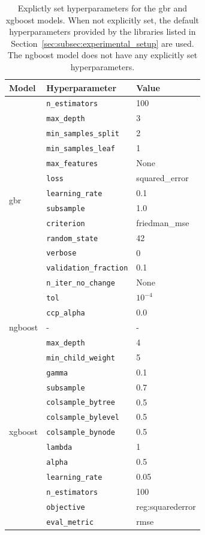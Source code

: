 \begin{table}[h]
\centering
\begin{tabular}{@{}llp{}@{}}
\toprule
\textbf{Model} & \textbf{Hyperparameter} & \textbf{Value} \\
\midrule
\multirow{14}{*}{\gls{gbr}}
& \texttt{n\_estimators} & 100 \\
& \texttt{max\_depth} & 3 \\
& \texttt{min\_samples\_split} & 2 \\
& \texttt{min\_samples\_leaf} & 1 \\
& \texttt{max\_features} & None \\
& \texttt{loss} & squared\_error \\
& \texttt{learning\_rate} & 0.1 \\
& \texttt{subsample} & 1.0 \\
& \texttt{criterion} & friedman\_mse \\
& \texttt{random\_state} & 42 \\
& \texttt{verbose} & 0 \\
& \texttt{validation\_fraction} & 0.1 \\
& \texttt{n\_iter\_no\_change} & None \\
& \texttt{tol} & $10^{-4}$ \\
& \texttt{ccp\_alpha} & 0.0 \\
\midrule
\gls{ngboost} & - & - \\
\midrule
\multirow{14}{*}{\gls{xgboost}}
& \texttt{max\_depth} & 4 \\
& \texttt{min\_child\_weight} & 5 \\
& \texttt{gamma} & 0.1 \\
& \texttt{subsample} & 0.7 \\
& \texttt{colsample\_bytree} & 0.5 \\
& \texttt{colsample\_bylevel} & 0.5 \\
& \texttt{colsample\_bynode} & 0.5 \\
& \texttt{lambda} & 1 \\
& \texttt{alpha} & 0.5 \\
& \texttt{learning\_rate} & 0.05 \\
& \texttt{n\_estimators} & 100 \\
& \texttt{objective} & reg:squarederror \\
& \texttt{eval\_metric} & rmse \\
\bottomrule
\end{tabular}
\caption{Explictly set hyperparameters for the \gls{gbr} and \gls{xgboost} models. When not explicitly set, the default hyperparameters provided by the libraries listed in Section~\ref{sec:subsec:experimental_setup} are used. The \gls{ngboost} model does not have any explicitly set hyperparameters.}
\label{tab:combined_hyperparameters}
\end{table}


